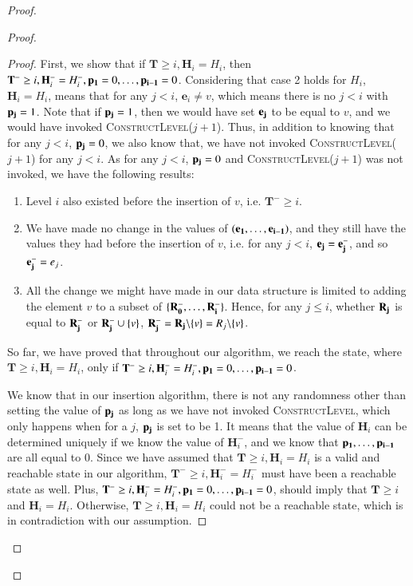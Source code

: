 \documentclass[11pt]{article}
\newcommand{\constLevel}{\textsc{ConstructLevel}}
\newcommand{\bE}{\ensuremath{\mathbf{e}}}
\newcommand{\bT}{\ensuremath{\mathbf{T}}}
\newcommand{\bH}{\ensuremath{\mathbf{H}}}
\begin{document}
\begin{proof}
\begin{proof}
\begin{proof}
First, we show that if $\bT \geq i, \bH_i = H_i$, then $\bT^- \geq i, \bH_i^- = H_i^-, \bold{p_1} = 0, \dots, \bold{p_{i - 1}} = 0$. 
Considering that case 2 holds for $H_i$, $\bH_i = H_i$, means that for any $j < i$, $\bE_i \neq v$, which means there is no $j < i$ with $\bold{p_j} = 1$. Note that if $\bold{p_j} = 1$, then we would have set $\bold{e_j}$ to be equal to $v$, and we would have invoked \constLevel($j + 1$). Thus, in addition to knowing that for any $j < i$, $\bold{p_j} = 0$, we also know that, we have not invoked \constLevel($j + 1$) for any $j < i$. As for any $j < i$, $\bold{p_j} = 0$ and \constLevel($j + 1$) was not invoked, we have the following results: 
\begin{enumerate}
    \item 
    Level $i$ also existed before the insertion of $v$, i.e. $\bT^- \geq i$.
    \item 
    We have made no change in the values of $(\bold{e_1}, \dots, \bold{e_{i - 1}})$, and they still have the values they had before the insertion of $v$, i.e. for any  $j < i$, $\bold{e_j} = \bold{e_j^-}$, and so $\bold{e_j^-} = e_j$. 
    \item
    All the change we might have made in our data structure is limited to adding the element $v$ to a subset of $\{\bold{R_0^-}, \dots, \bold{R_i^-}\}$. Hence, for any $j \leq i$, whether $\bold{R_j}$ is equal to $\bold{R_j^-}$ or $\bold{R_j^-} \cup \{v\}$, $\bold{R_j^-} = \bold{R_j} \backslash \{v\} = R_j \backslash \{v\}$. 
\end{enumerate}
So far, we have proved that throughout our algorithm, we reach the state, where $\bT \geq i, \bH_i = H_i$, only if $\bT^- \geq i, \bH_i^- = H_i^-, \bold{p_1} = 0, \dots, \bold{p_{i - 1}} = 0$.

We know that in our insertion algorithm, there is not any randomness other than setting the value of $\bold{p_j}$ as long as we have not invoked \constLevel, which only happens when for a $j$, $\bold{p_j}$ is set to be 1. It means that the value of $\bH_i$ can be determined uniquely if we know the value of $\bH_i^-$, and we know that $\bold{p_1}, \dots, \bold{p_{i - 1}}$ are all equal to $0$. 
Since we have assumed that $\bT \geq i, \bH_i = H_i$ is a valid and reachable state in our algorithm, $\bT^- \geq i, \bH_i^- = H_i^-$ must have been a reachable state as well. Plus, $\bT^- \geq i, \bH_i^- = H_i^-, \bold{p_1} = 0, \dots, \bold{p_{i - 1}} = 0$, should imply that $\bT \geq i$ and $ \bH_i = H_i$. Otherwise, $\bT \geq i, \bH_i = H_i$ could not be a reachable state, which is in contradiction with our assumption. 
\end{proof}


\end{proof}
\end{proof}
\end{document}
